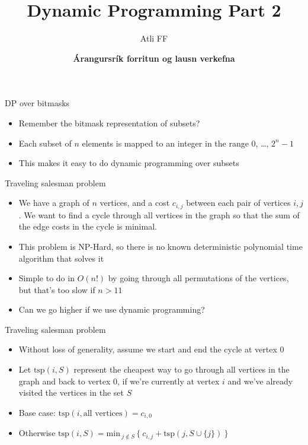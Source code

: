 \documentclass{beamer}
\title{Dynamic Programming Part 2}
\author{Atli FF}
\institute{\href{http://ru.is/td}{School of Computer Science} \\[2pt] \href{http://ru.is}{Reykjavík University}}
\date{\textbf{Árangursrík forritun og lausn verkefna}}
\begin{document}
\begin{frame}[plain]
    \titlepage
\end{frame}

\begin{frame}[plain]{DP over bitmasks}
    \begin{itemize}
        \item Remember the bitmask representation of subsets?
        \item Each subset of $n$ elements is mapped to an integer in the range $0$, \ldots, $2^{n} - 1$
        \item This makes it easy to do dynamic programming over subsets
    \end{itemize}
\end{frame}

\begin{frame}[plain]{Traveling salesman problem}
    \vspace{10pt}

    \begin{itemize}
        \item We have a graph of $n$ vertices, and a cost $c_{i,j}$ between each pair of vertices $i, j$. We want to find a cycle through all vertices in the graph so that the sum of the edge costs in the cycle is minimal.

        \vspace{5pt}
        \item This problem is NP-Hard, so there is no known deterministic polynomial time algorithm that solves it

        \vspace{10pt}
        \item Simple to do in $O(n!)$ by going through all permutations of the vertices, but that's too slow if $n > 11$

        \vspace{10pt}
        \item Can we go higher if we use dynamic programming?
    \end{itemize}
\end{frame}

\begin{frame}[plain]{Traveling salesman problem}
    \vspace{20pt}
    \begin{itemize}
\item Without loss of generality, assume we start and end the cycle at vertex $0$
    \vspace{10pt}

\item Let $\mathrm{tsp}(i, S)$ represent the cheapest way to go through all vertices in the graph and back to vertex $0$, if we're currently at vertex $i$ and we've already visited the vertices in the set $S$

    \vspace{20pt}
\item Base case: $\mathrm{tsp}(i, \textrm{all vertices}) = c_{i,0}$
\item Otherwise $\mathrm{tsp}(i, S) = \mathrm{min}_{\ j \not\in S\ } \{\ c_{i,j} + \mathrm{tsp}(j, S \cup \{j\})\ \}$
    \end{itemize}
\end{frame}
\end{document}
